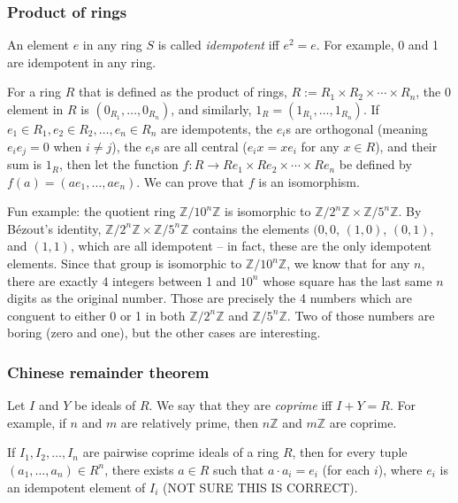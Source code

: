\documentclass[12pt]{article}
\begin{document}
\subsubsection{Product of rings}
An element $e$ in any ring $S$ is called \textit{idempotent} iff $e^2=e$. For example, 0 and 1 are idempotent in any ring.
\par
For a ring $R$ that is defined as the product of rings, $R := R_1 \times R_2 \times \cdots \times R_n$, the 0 element in $R$ is $(0_{R_1}, \dots, 0_{R_n})$, and similarly, $1_R = (1_{R_1}, \dots, 1_{R_n})$. If $e_1 \in R_1, e_2 \in R_2, \dots, e_n \in R_n$ are idempotents, the $e_i$s are orthogonal (meaning $e_i e_j =0$ when $i \neq j$), the $e_i$s are all central ($e_ix=xe_i$ for any $x \in R$), and their sum is $1_R$, then let the function $f: R \rightarrow Re_1 \times Re_2 \times \cdots \times Re_n$ be defined by $f(a)=(ae_1, \dots, ae_n)$. We can prove that $f$ is an isomorphism.
\par
Fun example: the quotient ring $ \mathbb{Z}/10^n\mathbb{Z}$ is isomorphic to $\mathbb{Z}/2^n\mathbb{Z} \times \mathbb{Z}/5^n\mathbb{Z}$. By Bézout's identity, $\mathbb{Z}/2^n\mathbb{Z} \times \mathbb{Z}/5^n\mathbb{Z}$ contains the elements $(0,0$, $(1,0)$, $(0,1)$, and $(1,1)$, which are all idempotent -- in fact, these are the only idempotent elements. Since that group is isomorphic to $ \mathbb{Z}/10^n\mathbb{Z}$, we know that for any $n$, there are exactly 4 integers between 1 and $10^n$ whose square has the last same $n$ digits as the original number. Those are precisely the 4 numbers which are conguent to either 0 or 1 in both $ \mathbb{Z}/2^n\mathbb{Z}$ and $ \mathbb{Z}/5^n\mathbb{Z}$. Two of those numbers are boring (zero and one), but the other cases are interesting.

\subsubsection{Chinese remainder theorem}
Let $I$ and $Y$ be ideals of $R$. We say that they are \textit{coprime} iff $I+Y=R$. For example, if $n$ and $m$ are relatively prime, then $n \mathbb{Z}$ and $m \mathbb{Z}$ are coprime.
\par
If $I_1, I_2, \dots, I_n$ are pairwise coprime ideals of a ring $R$, then for every tuple $(a_1, \dots, a_n) \in R^n$, there exists $a \in R$ such that $a\cdot a_i = e_i$ (for each $i$), where $e_i$ is an idempotent element of $I_i$ (NOT SURE THIS IS CORRECT).
\end{document}
